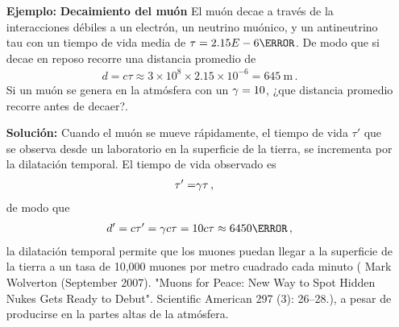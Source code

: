 \begin{frame}
\begin{itemize}
\item[\textbf{Ejemplo:}] \textbf{Decaimiento del muón} El muón decae a través de la interacciones débiles a un electrón, un neutrino muónico, y un antineutrino tau con un tiempo de vida media de $\tau=\SI{2.15E-6}{\second}$. De modo que si decae en reposo recorre una distancia promedio de
  \begin{align*}
    d=c\tau\approx 3\times 10^8\times 2.15\times 10^{-6}=\SI{645}{\meter}\,. 
  \end{align*}
Si un muón se genera en la atmósfera con un $\gamma=10$, ¿que distancia promedio recorre antes de decaer?.
\item[\textbf{Solución:}] Cuando el muón se mueve rápidamente, el tiempo de vida $\tau'$ que se observa desde un laboratorio en la superficie de la tierra, se incrementa por la dilatación temporal. El tiempo de vida observado es
  \begin{align*}
    \tau'=&\gamma\tau\,,
  \end{align*}
de modo que
\begin{align*}
  d'=c\tau'=\alert{\gamma} c\tau=10 c\tau\approx \SI{6450}{\meter}\,,
\end{align*}
la dilatación temporal permite que los muones puedan llegar a la superficie de la tierra a un tasa de 10,000 muones por metro cuadrado cada minuto ( Mark Wolverton (September 2007). "Muons for Peace: New Way to Spot Hidden Nukes Gets Ready to Debut". Scientific American 297 (3): 26–28.), a pesar de producirse en la partes altas de la atmósfera.
\end{itemize}
\end{frame}

